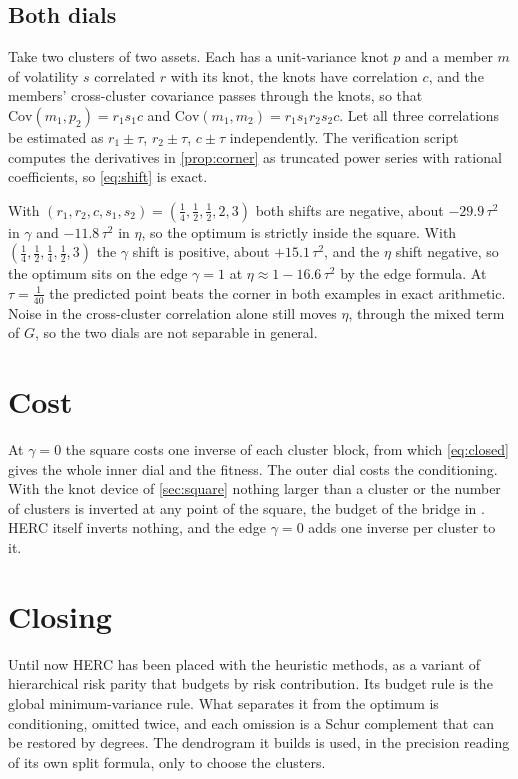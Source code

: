 \documentclass[11pt]{article}
\begin{document}
\subsection{Both dials}

Take two clusters of two assets. Each has a unit-variance knot $p$ and a
member $m$ of volatility $s$ correlated $r$ with its knot, the knots have
correlation $c$, and the members' cross-cluster covariance passes through
the knots, so that $\mathrm{Cov}(m_1,p_2)=r_1s_1c$ and
$\mathrm{Cov}(m_1,m_2)=r_1s_1r_2s_2c$. Let all three correlations be
estimated as $r_1\pm\tau$, $r_2\pm\tau$, $c\pm\tau$ independently. The
verification script computes the derivatives in \cref{prop:corner} as
truncated power series with rational coefficients, so \eqref{eq:shift} is
exact.

With $(r_1,r_2,c,s_1,s_2)=(\tfrac14,\tfrac12,\tfrac12,2,3)$ both shifts
are negative, about $-29.9\,\tau^2$ in $\gamma$ and $-11.8\,\tau^2$ in
$\eta$, so the optimum is strictly inside the square. With
$(\tfrac14,\tfrac12,\tfrac14,\tfrac12,3)$ the $\gamma$ shift is positive,
about $+15.1\,\tau^2$, and the $\eta$ shift negative, so the optimum sits
on the edge $\gamma=1$ at $\eta\approx1-16.6\,\tau^2$ by the edge formula.
At $\tau=\tfrac1{40}$ the predicted point beats the corner in both
examples in exact arithmetic. Noise in the cross-cluster correlation alone
still moves $\eta$, through the mixed term of $G$, so the two dials are not
separable in general.

\section{Cost}

At $\gamma=0$ the square costs one inverse of each cluster block, from
which \eqref{eq:closed} gives the whole inner dial and the fitness. The
outer dial costs the conditioning. With the knot device of
\cref{sec:square} nothing larger than a cluster or the number of clusters
is inverted at any point of the square, the budget of the bridge in
\cite{cotton2026nco}. HERC itself inverts nothing, and the edge $\gamma=0$
adds one inverse per cluster to it.

\section{Closing}

Until now HERC has been placed with the heuristic methods, as a variant of
hierarchical risk parity that budgets by risk contribution. Its budget rule
is the global minimum-variance rule. What separates it from the optimum is
conditioning, omitted twice, and each omission is a Schur complement that
can be restored by degrees. The dendrogram it builds is used, in the
precision reading of its own split formula, only to choose the clusters.
\end{document}
